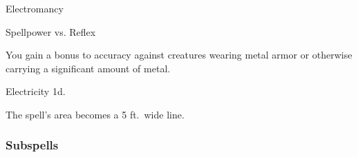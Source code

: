 \newpage
\begin{spellsection}{Electromancy}

\begin{spellheader}
\end{spellheader}

\begin{spellcontent}

\begin{spelltargetinginfo}




\end{spelltargetinginfo}


\begin{spelleffects}




\begin{spellattack}{Spellpower vs. Reflex}


\spellspecial You gain a  bonus to accuracy against creatures wearing metal armor or otherwise carrying a significant amount of metal.


\spellsuccess
Electricity  \minus1d.



\end{spellattack}





\end{spelleffects}

\end{spellcontent}
\begin{spellfooter}


\end{spellfooter}
\begin{spellsubcontent}


\begin{spellcantrip}
The spell's area becomes a 5 ft.\ wide \areamed line.
\end{spellcantrip}


\end{spellsubcontent}
\end{spellsection}


\subsubsection{Subspells}



